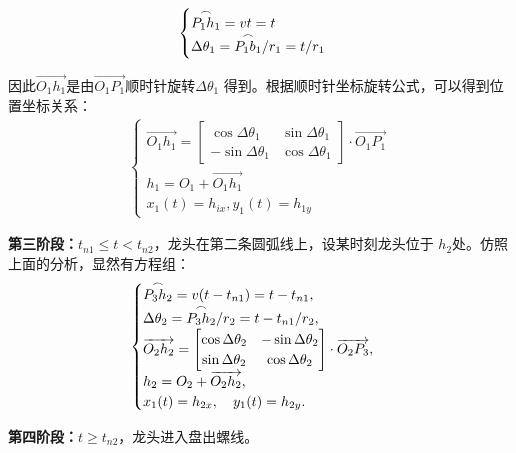 \documentclass{cumcmthesis1}
\begin{document}
\begin{align}
    \begin{cases}
        \overset{\LARGE{\frown}}{P_1 h_1}=vt=t\\
        \Delta \theta_1=\overset{\LARGE{\frown}}{P_1 b_1}/r_1=t/r_1\\
    \end{cases}
\end{align}
\par
因此$\overrightarrow{O_1  h_1}$是由$\overrightarrow{O_1  P_1}$顺时针旋转$\Delta \theta_1$
得到。根据顺时针坐标旋转公式，可以得到位置坐标关系：
\begin{align}
    \begin{cases}
        \overrightarrow{O_1  h_1}=
        \begin{bmatrix}
            \cos\Delta \theta_1 & \sin\Delta \theta_1 \\
            -\sin\Delta \theta_1 & \cos\Delta \theta_1
        \end{bmatrix}
        \cdot \overrightarrow{O_1  P_1}\\
        h_1=O_1+\overrightarrow{O_1  h_1}\\
        x_1(t)=h_{ix},y_1(t)=h_{1y}
    \end{cases}
\end{align}
\par
\textbf{第三阶段：}$t_{n1} \leq t< t_{n2}$，龙头在第二条圆弧线上，设某时刻龙头位于
$h_2$处。仿照上面的分析，显然有方程组：
\begin{align}
    \begin{cases}
        \overset{\LARGE{\frown}}{P_3 h_2} = v(t - t_{n1}) = t - t_{n1}, \\
        \Delta \theta_2 = \overset{\LARGE{\frown}}{P_3 h_2}/r_2 = t - t_{n1}/r_2, \\
        \overrightarrow{O_2 h_2} =
        \begin{bmatrix}
            \cos \Delta \theta_2 & -\sin \Delta \theta_2 \\
            \sin \Delta \theta_2 & \cos \Delta \theta_2
        \end{bmatrix}
        \cdot \overrightarrow{O_2 P_3}, \\
        h_2 = O_2 + \overrightarrow{O_2 h_2}, \\
        x_1(t) = h_{2x}, \quad y_1(t) = h_{2y}.
    \end{cases}
\end{align}
\par
\textbf{第四阶段：}$t \geq  t_{n2}$，龙头进入盘出螺线。
\end{document}
